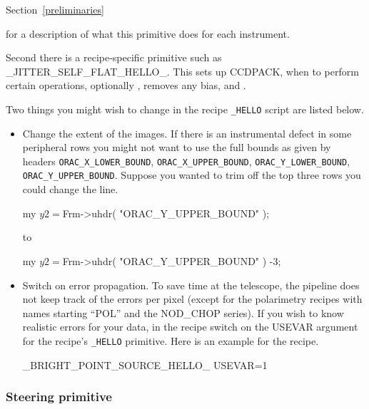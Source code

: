 \documentclass[twoside,11pt,nolof]{starlink}
\providecommand{\CCDPACK}{{\footnotesize CCDPACK}}
\begin{document}
\begin{latexonly}
Section~\ref{preliminaries}
\end{latexonly}
for a description of what this primitive does for each instrument.

Second there is a recipe-specific primitive such as
\_JITTER\_SELF\_FLAT\_HELLO\_.  This sets up \CCDPACK,
 when to perform certain
operations, optionally ,
removes any bias, and .

Two things you might wish to change in the recipe {\tt\_HELLO} script are
listed below.

\begin{itemize}

\item Change the extent of the images.  If there is an instrumental
defect in some peripheral rows you might not want to use the full
bounds as given by headers \texttt{ORAC\_X\_LOWER\_BOUND},
\texttt{ORAC\_X\_UPPER\_BOUND}, \texttt{ORAC\_Y\_LOWER\_BOUND},
\texttt{ORAC\_Y\_UPPER\_BOUND}.  Suppose you wanted to trim off the top
three rows you could change the line.

\begin{terminalv}
    my $y2 = $Frm->uhdr( "ORAC_Y_UPPER_BOUND" );
\end{terminalv}
to
\begin{terminalv}
    my $y2 = $Frm->uhdr( "ORAC_Y_UPPER_BOUND" ) -3;
\end{terminalv}

\item
{}\label{switch_on_data_variance}
Switch on error propagation.  To save time at the telescope, the
pipeline does not keep track of the errors per pixel (except for the
polarimetry recipes with names starting ``POL'' and the NOD\_CHOP
series).  If you wish to know realistic errors for your data, in the
recipe switch on the USEVAR argument for the recipe's {\tt\_HELLO}
primitive.  Here is an example for the
 recipe.

\begin{terminalv}
    _BRIGHT_POINT_SOURCE_HELLO_ USEVAR=1
\end{terminalv}

\end{itemize}

\subsubsection{Steering
primitive\label{steering_primitive}}
\end{document}

